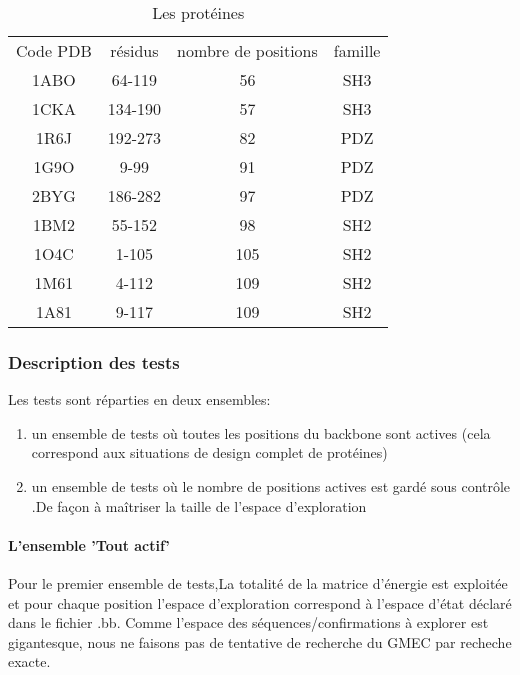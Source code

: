     \begin{table}[!htbp]
      \centering

      \begin{tabular}{cccc}

        \toprule
        Code PDB & résidus & nombre de positions & famille\\
        \cmidrule{1-4}
        1ABO & 	64-119	 & 	56	 & SH3 \\
        1CKA & 	134-190	 & 	57	 & SH3 \\
        1R6J & 	192-273	 & 	82	 & PDZ \\
        1G9O & 	9-99	 & 	91	 & PDZ \\
        2BYG & 	186-282	 & 	97	 & PDZ \\
        1BM2 & 	55-152	 & 	98	 & SH2 \\
        1O4C & 	1-105	 & 	105	 & SH2 \\
        1M61 & 	4-112	 & 	109	 & SH2 \\
        1A81 & 	9-117	 & 	109	 & SH2 \\
        \bottomrule

      \end{tabular}      
      \caption{Les protéines}
\label{tab:protéines}      
    \end{table}

\subsubsection{Description des tests}

Les tests sont réparties en deux ensembles:
\begin{enumerate}
\item un ensemble de tests où toutes les positions du backbone sont actives (cela correspond aux situations de design complet de protéines) 
\item un ensemble de tests où le nombre de positions actives est gardé sous contrôle .De façon à maîtriser la taille de l'espace d'exploration
\end{enumerate}


\paragraph{L'ensemble 'Tout actif'}

Pour le premier ensemble de tests,La totalité de la matrice d'énergie est exploitée et pour chaque position l'espace d'exploration correspond à l'espace d'état déclaré dans le fichier .bb.
Comme l'espace des séquences/confirmations à explorer est gigantesque, nous ne faisons pas de tentative de recherche du GMEC  par recheche exacte. 

